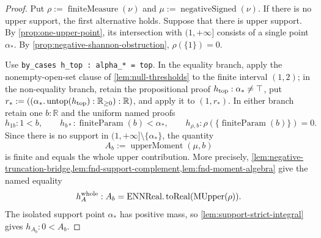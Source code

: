 \documentclass[9pt]{extarticle}
\theoremstyle{definition}
\theoremstyle{remark}
\newcommand{\R}{\mathbb R}
\begin{document}
\begin{proof}
Put $\rho:=\operatorname{finiteMeasure}(\nu)$ and
$\mu:=\operatorname{negativeSigned}(\nu)$.
If there is no upper support, the first alternative holds. Suppose that there
is upper support. By \cref{prop:one-upper-point}, its intersection with
$(1,+\infty]$ consists of a single point $\alpha_*$. By
\cref{prop:negative-shannon-obstruction}, $\rho(\{1\})=0$.

Use \texttt{by\_cases h\_top : alpha\_* = top}.  In the equality branch,
apply the nonempty-open-set
clause of \cref{lem:null-thresholds} to the finite interval $(1,2)$; in the
non-equality branch, retain the propositional proof
$h_{\rm top}:\alpha_*\neq\top$, put
$r_*:=((\alpha_*.\operatorname{untop}(h_{\rm top}):\R_{\geq0}):\R)$, and apply it to
$(1,r_*)$.  In either branch retain one $b:\R$ and the uniform named proofs
\[
 h_{1b}:1<b,\qquad
 h_{b*}:\operatorname{finiteParam}(b)<\alpha_*,\qquad
 h_{\rho,b}:\rho(\{\operatorname{finiteParam}(b)\})=0.
\]
Since there is no support in
$(1,+\infty]\setminus\{\alpha_*\}$, the quantity
\[
 A_b:=\operatorname{upperMoment}(\mu,b)
\]
is finite and equals the whole upper contribution.  More precisely,
\cref{lem:negative-truncation-bridge,lem:fnd-support-complement,lem:fnd-moment-algebra}
give the named equality
\[
 h_A^{\rm whole}:A_b=
  \operatorname{ENNReal.toReal}(\operatorname{MUpper}(\rho)).
\]
The isolated support point $\alpha_*$ has positive mass, so
\cref{lem:support-strict-integral} gives $h_{A_b}:0<A_b$.


\end{proof}
\end{document}
